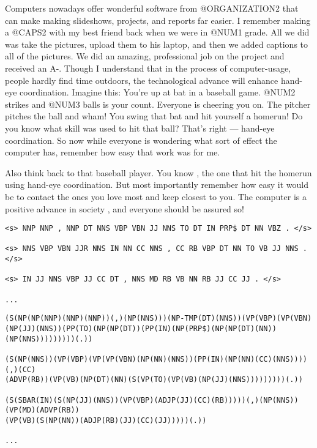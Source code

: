 \documentclass[11pt]{article}
\begin{document}
Computers nowadays offer wonderful software from @ORGANIZATION2 that can make
making slideshows, projects, and reports far easier. I remember making a
@CAPS2 with my best friend back when we were in @NUM1 grade. All we did was
take the pictures, upload them to his laptop, and then we added captions to
all of the pictures.  We did an amazing, professional job on the project and
received an A-.  Though I understand that in the process of computer-usage,
people hardly find time outdoors, the technological advance will enhance
hand-eye coordination.  Imagine this: You're up at bat in a baseball game.
@NUM2 strikes and @NUM3 balls is your count.  Everyone is cheering you on. The
pitcher pitches the ball and wham!  You swing that bat and hit yourself a
homerun!  Do you know what skill was used to hit that ball?  That's right ---
hand-eye coordination.  So now while everyone is wondering what sort of effect
the computer has, remember how easy that work was for me.

Also think back to that baseball player.  You know , the one that hit the
homerun using hand-eye coordination.  But most importantly remember how easy it
would be to contact the ones you love most and keep closest to you.  The
computer is a positive advance in society , and everyone should be assured so!

\begin{verbatim}
<s> NNP NNP , NNP DT NNS VBP VBN JJ NNS TO DT IN PRP$ DT NN VBZ . </s>

<s> NNS VBP VBN JJR NNS IN NN CC NNS , CC RB VBP DT NN TO VB JJ NNS . </s>

<s> IN JJ NNS VBP JJ CC DT , NNS MD RB VB NN RB JJ CC JJ . </s>

...
\end{verbatim}

\begin{verbatim}
(S(NP(NP(NNP)(NNP)(NNP))(,)(NP(NNS)))(NP-TMP(DT)(NNS))(VP(VBP)(VP(VBN)
(NP(JJ)(NNS))(PP(TO)(NP(NP(DT))(PP(IN)(NP(PRP$)(NP(NP(DT)(NN))(NP(NNS)))))))))(.))

(S(NP(NNS))(VP(VBP)(VP(VP(VBN)(NP(NN)(NNS))(PP(IN)(NP(NN)(CC)(NNS))))(,)(CC)
(ADVP(RB))(VP(VB)(NP(DT)(NN)(S(VP(TO)(VP(VB)(NP(JJ)(NNS)))))))))(.))

(S(SBAR(IN)(S(NP(JJ)(NNS))(VP(VBP)(ADJP(JJ)(CC)(RB)))))(,)(NP(NNS))(VP(MD)(ADVP(RB))
(VP(VB)(S(NP(NN))(ADJP(RB)(JJ)(CC)(JJ)))))(.))

...
\end{verbatim}
\end{document}
